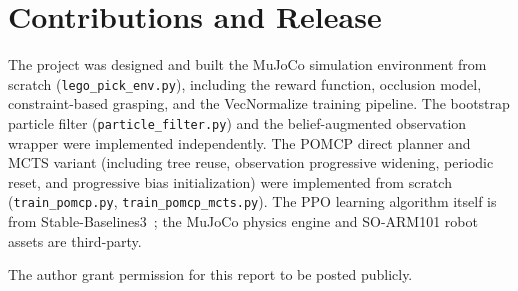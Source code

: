 \documentclass[conference]{IEEEtran}
\begin{document}
\section*{Contributions and Release}

The project was designed and built the MuJoCo simulation environment from scratch
(\texttt{lego\_pick\_env.py}), including the reward function, occlusion model,
constraint-based grasping, and the VecNormalize training pipeline.
The bootstrap particle filter (\texttt{particle\_filter.py}) and the
belief-augmented observation wrapper were implemented independently.
The POMCP direct planner and MCTS variant (including tree reuse, observation
progressive widening, periodic reset, and progressive bias initialization)
were implemented from scratch (\texttt{train\_pomcp.py},
\texttt{train\_pomcp\_mcts.py}).
The PPO learning algorithm itself is from Stable-Baselines3~\cite{raffin2021sb3};
the MuJoCo physics engine and SO-ARM101 robot assets are third-party.

The author grant permission for this report to be posted publicly.
\end{document}
